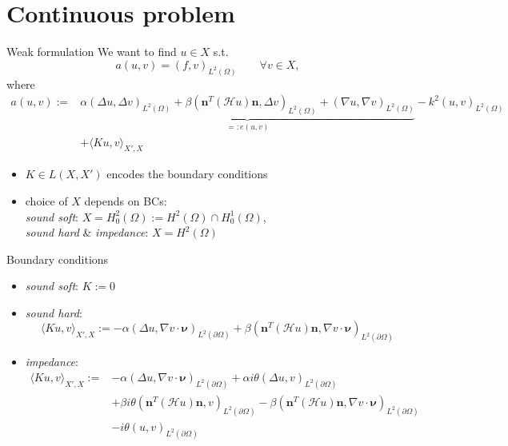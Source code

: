 \documentclass[11pt,aspectratio=169,xcolor=dvipsnames]{beamer}
\newcommand{\nv}{\bm{\nu}}
\newcommand{\spl}{\langle}
\newcommand{\spr}{\rangle}
\newcommand{\nicearrow}[2]{\raisebox{#2}{\resizebox{0.45cm}{!}{\color{#1}{\MVRightArrow}\color{black}}}}
\begin{document}
\section{Continuous problem}
\mysectionpage

\begin{frame}{Weak formulation}
  We want to find $u \in X$ s.t. 
  \begin{equation}
    a(u,v) = (f,v)_{L^2(\Omega)} \qquad \forall v \in X, \tag{CP} \label{CP}
  \end{equation}
  \vspace*{-0.4cm}
  where 
  \begin{align*}
    a(u,v) := &\underbrace{\alpha (\Delta u, \Delta v)_{L^2(\Omega)} + \beta (\bm{n}^T (\mathcal{H} u) \bm{n}, \Delta v)_{L^2(\Omega)} + (\nabla u, \nabla v)_{L^2(\Omega)}}_{=: e(u,v)} - k^2(u,v)_{L^2(\Omega)}\\
    &+ \spl Ku,v \spr_{X',X}
  \end{align*}
  \begin{itemize}
    \item[\nicearrow{GOE}{-0.06cm}] $K \in L(X,X')$ encodes the boundary conditions
    \item[\nicearrow{GOE}{-0.06cm}] choice of $X$ depends on BCs: \\
    \quad \emph{sound soft}: $X = H^2_0(\Omega) := H^2(\Omega) \cap H^1_0(\Omega)$, \\
    \quad \emph{sound hard} \& \emph{impedance}: $X = H^2(\Omega)$
  \end{itemize}
\end{frame}

\begin{frame}{Boundary conditions}
  \begin{itemize}
    \item \emph{sound soft}: $K := 0$
    \item \emph{sound hard}: 
    \begin{equation*}
      \spl Ku,v \spr_{X',X} := - \alpha (\Delta u, \nabla v \cdot \nv)_{L^2(\partial \Omega)} + \beta (\bm{n}^T(\mathcal{H} u) \bm{n},\nabla v \cdot \nv)_{L^2(\partial \Omega)} 
    \end{equation*}
    \item \emph{impedance}:
    \begin{equation*}
      \begin{aligned}
        \spl Ku,v \spr_{X',X} := &- \alpha (\Delta u, \nabla v \cdot \nv)_{L^2(\partial \Omega)} + \alpha i \theta (\Delta u, v)_{L^2(\partial \Omega)} \\
        &+ \beta i \theta (\bm{n}^T(\mathcal{H} u) \bm{n},v)_{L^2(\partial \Omega)} - \beta (\bm{n}^T(\mathcal{H} u) \bm{n},\nabla v \cdot \nv)_{L^2(\partial \Omega)} \\
        &- i \theta (u,v)_{L^2(\partial \Omega)}
      \end{aligned}
    \end{equation*}
  \end{itemize}
\end{frame}
\end{document}
